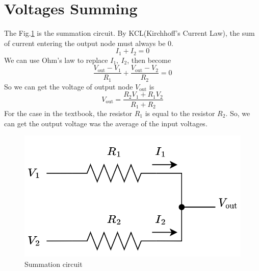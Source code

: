\documentclass[a4paper, 12pt, AutoFakeBold]{report}
\newcommand{\figref}[1]{Fig.\ref{#1}}
\begin{document}
    \section{Voltages Summing}
    \label{ch:Voltage_sum}
    The \figref{fig:Summation_circuit} is the summation circuit. By KCL(Kirchhoff's Current Law), the sum of current entering the output node must always be 0.
    \begin{equation}
        I_1+I_2=0
    \end{equation}
    We can use Ohm's law to replace $I_1,\ I_2$, then become
    \begin{equation}
        \frac{V_\text{out}-V_1}{R_1}+\frac{V_\text{out}-V_2}{R_2}=0
    \end{equation}
    So we can get the voltage of output node $V_\text{out}$ is
    \begin{equation}
        V_\text{out}=\frac{R_2V_1+R_1V_2}{R_1+R_2}
    \end{equation}
    For the case in the textbook, the resistor $R_1$ is equal to the resistor $R_2$. So, we can get the output voltage was the average of the input voltages.
    \begin{figure}[H]
        \centering
        \includegraphics[scale=.4]{figs/Circuit_Sum.png}
        \caption{Summation circuit}
        \label{fig:Summation_circuit}
    \end{figure}
\end{document}
